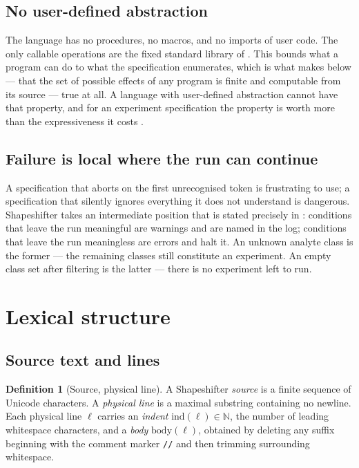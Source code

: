 \documentclass[11pt,twocolumn,a4paper]{article}
\theoremstyle{ssthm}
\theoremstyle{definition}
\newtheorem{definition}[theorem]{Definition}
\theoremstyle{remark}
\newcommand{\N}{\mathbb{N}}
\newcommand{\shk}[1]{\texttt{#1}}
\begin{document}
\subsection{No user-defined abstraction}

The language has no procedures, no macros, and no imports of user code.
The only callable operations are the fixed standard library of
. This bounds what a program can do to what the
specification enumerates, which is what makes 
below --- that the set of possible effects of any program is finite and
computable from its source --- true at all. A language with
user-defined abstraction cannot have that property, and for an
experiment specification the property is worth more than the
expressiveness it costs \citep{mernik2005when,vandeursen2000domain}.

\subsection{Failure is local where the run can continue}

A specification that aborts on the first unrecognised token is
frustrating to use; a specification that silently ignores everything it
does not understand is dangerous. Shapeshifter takes an intermediate
position that is stated precisely in
: conditions that leave the run
meaningful are warnings and are named in the log; conditions that leave
the run meaningless are errors and halt it. An unknown analyte class is
the former --- the remaining classes still constitute an experiment. An
empty class set after filtering is the latter --- there is no experiment
left to run.

\section{Lexical structure}
\label{sec:lexical}

\subsection{Source text and lines}

\begin{definition}[Source, physical line]
\label{def:source}
A Shapeshifter \emph{source} is a finite sequence of Unicode characters.
A \emph{physical line} is a maximal substring containing no newline. Each
physical line $\ell$ carries an \emph{indent} $\mathrm{ind}(\ell)\in\N$,
the number of leading whitespace characters, and a \emph{body}
$\mathrm{body}(\ell)$, obtained by deleting any suffix beginning with the
comment marker \shk{//} and then trimming surrounding whitespace.
\end{definition}
\end{document}
